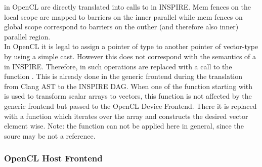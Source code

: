  in OpenCL are directly translated into calls to  in INSPIRE. Mem fences on the local scope are mapped to barriers on the inner parallel while mem fences on global scope correspond to barriers on the outher (and therefore also inner) parallel region. \\

In OpenCL it is legal to assign a pointer of type  to another pointer of vector-type  by using a simple cast. However this does not correspond with the semantics of a  in INSPIRE. Therefore, in such operations are replaced with a call to the function . This is already done in the generic frontend during the translation from Clang AST to the INSPIRE DAG. When one of the function starting with  is used to transform scalar arrays to vectors, this function is not affected by the generic frontend but passed to the OpenCL Device Frontend. There it is replaced with a function which iterates over the array and constructs the desired vector element wise. Note: the function  can not be applied here in general, since the soure may be not a reference. \\




\subsubsection{OpenCL Host Frontend}
\label{sec:Insieme.HostCL}

